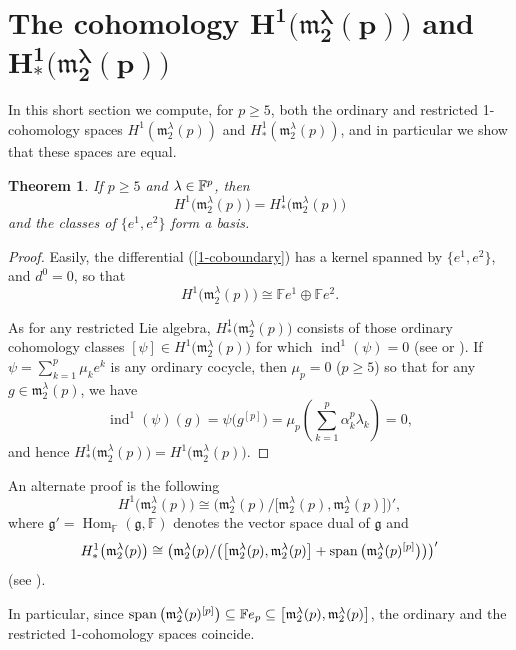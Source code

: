 \documentclass[pdftex]{sigma}
\def\spn{\mathop{\rm span}}
\def\Hom{\operatorname{Hom}}
\def\ind{\operatorname{ind}}
\def\m{\mathfrak m}
\def\F{\mathbb F}
\numberwithin{equation}{section}
\newtheorem{Theorem}{Theorem}[section]
\begin{document}
\section[The cohomology $H^1\big(\m_2^\lambda(p)\big)$ and $H^1_*\big(\m_2^\lambda(p)\big)$]{The cohomology $\boldsymbol{H^1\big(\m_2^\lambda(p)\big)}$ and $\boldsymbol{H^1_*\big(\m_2^\lambda(p)\big)}$}\label{section3}

In this short section we compute, for $p\ge 5$, both the ordinary and restricted 1-cohomology spaces $H^1(\m_2^\lambda(p))$ and $H^1_*(\m_2^\lambda(p))$, and in particular we show that these spaces are equal.

\begin{Theorem}\label{1-coho}
If $p\ge 5$ and ${\bf \lambda} \in \F^p$, then \[H^1\big(\m_2^\lambda(p)\big)=H^1_*\big(\m_2^\lambda(p)\big)\] and the classes of $\big\{e^1,e^2\big\}$ form a basis.
\end{Theorem}

\begin{proof} Easily, the differential (\ref{1-coboundary}) has a kernel spanned by $\big\{e^1,e^2\big\} $, and $d^0=0$, so that
 \[H^1\big(\m_2^\lambda(p)\big)\cong\F e^1\oplus \F e^2.\]

As for any restricted Lie algebra, $H^1_*\big(\m_2 ^\lambda (p)\big)$ consists of those ordinary cohomology classes $[\psi]\in H^1 \big(\m_2^\lambda (p)\big)$ for which $\ind^1(\psi)=0$ (see \cite[Theorem~2.1]{Hochschild1954} or \cite[Theorem~2]{EvansFuchs2008}). If $\psi =\sum_{k=1}^p \mu_ke^k$ is any ordinary cocycle, then $\mu_p=0$ ($p\ge 5$) so that for any
 $g\in \m_2^\lambda (p)$, we have
 \[\ind^1(\psi)(g)=\psi\big(g^{[p]}\big)=\mu_p\left (\sum_{k=1}^p \alpha_k^p\lambda_k\right )=0,\] and hence $H^1_*\big(\m_2^\lambda(p)\big)=H^1\big(\m_2^\lambda(p)\big)$.
\end{proof}

\begin{Remark} An alternate proof is the following
 \[
 H^1\big(\m_2^{\lambda}(p)\big)\cong \big(\m_2^{\lambda}(p)/\big[\m_2^{\lambda}(p), \m_2^{\lambda}(p)\big]\big)',
 \]
 where $\mathfrak g'=\Hom_\F(\mathfrak g,\F)$ denotes the vector space dual of $\mathfrak g$ and
 \[
 H^1_*\big(\m_2^{\lambda}(p)\big) \cong \big(\m_2^{\lambda}(p)/\big(\big[\m_2^{\lambda}(p),\m_2^{\lambda}(p)\big]+
 \spn\big(\m_2^{\lambda}(p)^{[p]}\big)\big)\big)'
 \]
 (see \cite[Proposition~2.7]{Feldvoss1991}).

In particular, since $\spn\big(\m_2^{\lambda}(p)^{[p]}\big)\subseteq \F e_p \subseteq\big[\m_2^{\lambda}(p),\m_2^{\lambda}(p)\big]$, the ordinary and the restricted 1-cohomology spaces coincide.
\end{Remark}
\end{document}
